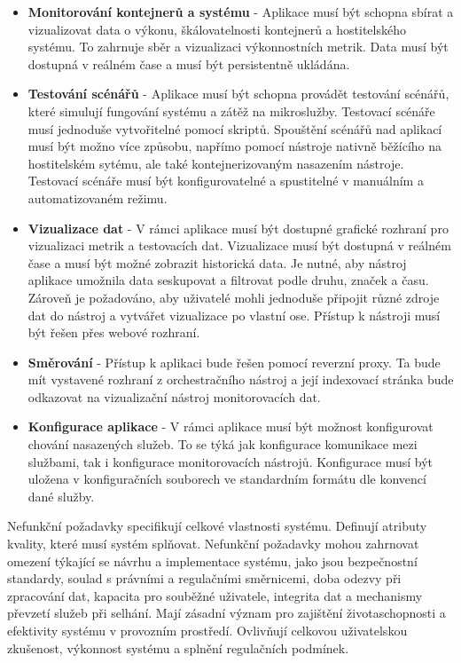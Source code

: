 \begin{itemize}
  \item \textbf{Monitorování kontejnerů a systému} - Aplikace musí být schopna sbírat a vizualizovat data o výkonu, škálovatelnosti kontejnerů a hostitelského systému. To zahrnuje sběr a vizualizaci výkonnostních metrik. Data musí být dostupná v reálném čase a musí být persistentně ukládána.
  \item \textbf{Testování scénářů} - Aplikace musí být schopna provádět testování scénářů, které simulují fungování systému a zátěž na mikroslužby. Testovací scénáře musí jednoduše vytvořitelné pomocí skriptů. Spouštění scénářů nad aplikací musí být možno více způsobu, napřímo pomocí nástroje nativně běžícího na hostitelském sytému, ale také kontejnerizovaným nasazením nástroje. Testovací scénáře musí být konfigurovatelné a spustitelné v manuálním a automatizovaném režimu. 
  \item \textbf{Vizualizace dat} - V rámci aplikace musí být dostupné grafické rozhraní pro vizualizaci metrik a testovacích dat. Vizualizace musí být dostupná v reálném čase a musí být možné zobrazit historická data. Je nutné, aby nástroj aplikace umožnila data seskupovat a filtrovat podle druhu, značek a času. Zároveň je požadováno, aby uživatelé mohli jednoduše připojit různé zdroje dat do nástroj a vytvářet vizualizace po vlastní ose. Přístup k nástroji musí být řešen přes webové rozhraní.
  \item \textbf{Směrování} - Přístup k aplikaci bude řešen pomocí reverzní proxy. Ta bude mít vystavené rozhraní z orchestračního nástroj a její indexovací stránka bude odkazovat na vizualizační nástroj monitorovacích dat.
  \item \textbf{Konfigurace aplikace} - V rámci aplikace musí být možnost konfigurovat chování nasazených služeb. To se týká jak konfigurace komunikace mezi službami, tak i konfigurace monitorovacích nástrojů. Konfigurace musí být uložena v konfiguračních souborech ve standardním formátu dle konvencí dané služby.
\end{itemize}


Nefunkční požadavky specifikují celkové vlastnosti systému. Definují atributy kvality, které musí systém splňovat. Nefunkční požadavky mohou zahrnovat omezení týkající se návrhu a implementace systému, jako jsou bezpečnostní standardy, soulad s právními a regulačními směrnicemi, doba odezvy při zpracování dat, kapacita pro souběžné uživatele, integrita dat a mechanismy převzetí služeb při selhání. Mají zásadní význam pro zajištění životaschopnosti a efektivity systému v provozním prostředí. Ovlivňují celkovou uživatelskou zkušenost, výkonnost systému a splnění regulačních podmínek.


